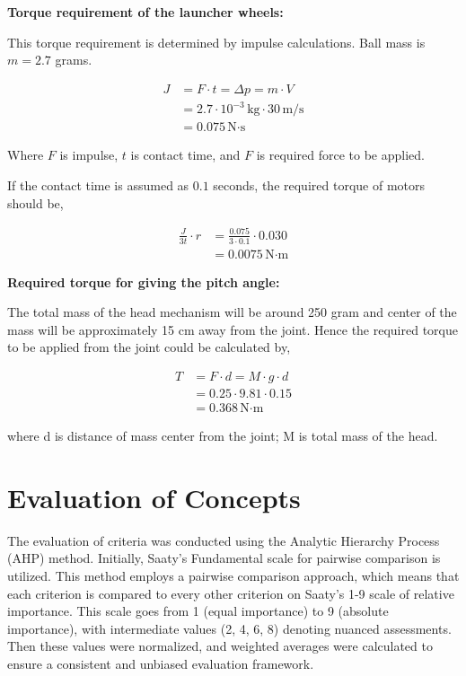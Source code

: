 \documentclass[12pt]{article}
\begin{document}
    \textbf{Torque requirement of the launcher wheels:}

    This torque requirement is determined by impulse calculations. Ball mass is $m=2.7$ grams.

    \begin{align}
        J &= F \cdot t = \Delta p = m \cdot V \\
        &= 2.7 \cdot 10^{-3} \, \text{kg} \cdot 30 \, \text{m/s} \\
        &= 0.075 \, \text{N·s}
    \end{align}
    
    Where $F$ is impulse, $t$ is contact time, and $F$ is required force to be applied.

    If the contact time is assumed as $0.1$ seconds, the required torque of motors should be,

    \begin{align}
        \frac{J}{3t} \cdot r &= \frac{0.075}{3 \cdot 0.1} \cdot 0.030 \\
                              &= 0.0075 \, \text{N·m}
    \end{align}
    
    
    \textbf{Required torque for giving the pitch angle:}

    The total mass of the head mechanism will be around 250 gram and center of the mass will be approximately 15 cm away from the joint. Hence the required torque to be applied from the joint could be calculated by,

    \begin{align}
        T &= F \cdot d = M \cdot g \cdot d \\
          &= 0.25 \cdot 9.81 \cdot 0.15 \\
          &= 0.368 \, \text{N·m}
    \end{align}
    
    where d is distance of mass center from the joint; M is total mass of the head.
    

\section{Evaluation of Concepts}

The evaluation of criteria was conducted using the Analytic Hierarchy Process (AHP) method. Initially, Saaty's Fundamental scale for pairwise comparison is utilized. This method employs a pairwise comparison approach, which means that each criterion is compared to every other criterion on Saaty's 1-9 scale of relative importance. This scale goes from 1 (equal importance) to 9 (absolute importance), with intermediate values (2, 4, 6, 8) denoting nuanced assessments. Then these values were normalized, and weighted averages were calculated to ensure a consistent and unbiased evaluation framework.
\end{document}
